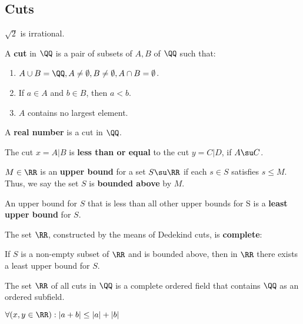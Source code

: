 \documentclass[11pt]{scrartcl}
\begin{document}
\subsection{Cuts}
\label{sec:org8a10d3a}
\begin{theorem}
\(\sqrt 2\) is irrational.
\end{theorem}
\begin{definition}
  A \textbf{cut} in $\QQ$ is a pair of subsets of $A, B$ of $\QQ$ such
  that:
  \begin{enumerate}[label=(\alph*)]
  \item
    $A\cup B = \QQ, A \neq \emptyset, B \neq \emptyset, A\cap B =
    \emptyset$.
  \item If $a\in A$ and $b\in B$, then $a<b$.
  \item $A$ contains no largest element.
  \end{enumerate}
\end{definition}
\begin{definition}
  A \textbf{real number} is a cut in $\QQ$.
\end{definition}

\begin{definition}
  The cut $x=A\vert B$ is \textbf{less than or equal} to the cut
  $y=C\vert D$, if $A\su C$.
\end{definition}
\begin{definition}
  $M\in \RR$ is an \textbf{upper bound} for a set $S\su \RR$ if each
  $s\in S$ satisfies $s\leq M$. Thus, we say the set $S$ is
  \textbf{bounded above} by $M$.\vs

  An upper bound for $S$ that is less than all other upper bounds for
  S is a \textbf{least upper bound} for $S$.
\end{definition}
\begin{theorem}
  The set $\RR$, constructed by the means of Dedekind cuts, is \textbf{complete}:

  \begin{center}
    If $S$ is a non-empty subset of $\RR$ and is bounded above, then in
    $\RR$ there exists a least upper bound for $S$.
  \end{center}
\end{theorem}
\begin{theorem}
  The set $\RR$ of all cuts in $\QQ$ is a complete ordered field that
  contains $\QQ$ as an ordered subfield.
\end{theorem}
\begin{theorem}
  $\forall(x,y\in\RR): |a+b| \leq |a| + |b|$
\end{theorem}
\end{document}
